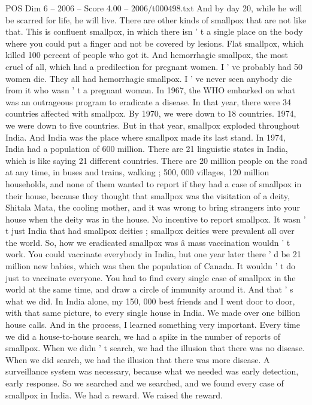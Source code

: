 \begin{textsample}{POS Dim 6 – 2006 – Score 4.00 – 2006/t000498.txt}
And by day 20, while he will be scarred for life, he will live.
There are other kinds of smallpox that are not like that.
This is confluent smallpox, in which there isn ' t a single place on the body where you could put a finger and not be covered by lesions.
Flat smallpox, which killed 100 percent of people who got it.
And hemorrhagic smallpox, the most cruel of all, which had a predilection for pregnant women.
I ' ve probably had 50 women die.
They all had hemorrhagic smallpox.
I ' ve never seen anybody die from it who wasn ' t a pregnant woman.
In 1967, the WHO embarked on what was an outrageous program to eradicate a disease.
In that year, there were 34 countries affected with smallpox.
By 1970, we were down to 18 countries. 1974, we were down to five countries.
But in that year, smallpox exploded throughout India.
And India was the place where smallpox made its last stand.
In 1974, India had a population of 600 million.
There are 21 linguistic states in India, which is like saying 21 different countries.
There are 20 million people on the road at any time, in buses and trains, walking ; 500, 000 villages, 120 million households, and none of them wanted to report if they had a case of smallpox in their house, because they thought that smallpox was the visitation of a deity, Shitala Mata, the cooling mother, and it was wrong to bring strangers into your house when the deity was in the house.
No incentive to report smallpox.
It wasn ' t just India that had smallpox deities ; smallpox deities were prevalent all over the world.
So, how we eradicated smallpox was â mass vaccination wouldn ' t work.
You could vaccinate everybody in India, but one year later there ' d be 21 million new babies, which was then the population of Canada.
It wouldn ' t do just to vaccinate everyone.
You had to find every single case of smallpox in the world at the same time, and draw a circle of immunity around it.
And that ' s what we did.
In India alone, my 150, 000 best friends and I went door to door, with that same picture, to every single house in India.
We made over one billion house calls.
And in the process, I learned something very important.
Every time we did a house-to-house search, we had a spike in the number of reports of smallpox.
When we didn ' t search, we had the illusion that there was no disease.
When we did search, we had the illusion that there was more disease.
A surveillance system was necessary, because what we needed was early detection, early response.
So we searched and we searched, and we found every case of smallpox in India.
We had a reward.
We raised the reward.

\end{textsample}
